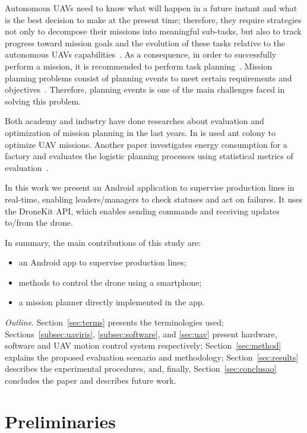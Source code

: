 \documentclass[12pt]{article}
\begin{document}
Autonomous UAVs need to know what will happen in a future instant and what is the best decision to make at the present time; therefore, they require strategies not only to decompose their missions into meaningful sub-tasks, but also to track progress toward mission goals and the evolution of these tasks relative to the autonomous UAVs capabilities~\cite{finn2012developments}. As a consequence, in order to successfully perform a mission, it is recommended to perform task planning~\cite{finn2012developments}. Mission planning problems consist of planning events to meet certain requirements and objectives~\cite{krozel1988search}. Therefore, planning events is one of the main challenges faced in solving this problem.

Both academy and industry have done researches about evaluation and optimization of mission planning in the last years. In \cite{schwarz2012towards} is used ant colony to optimize UAV missions. Another paper investigates energy consumption for a factory and evaluates the logistic planning processes using statistical metrics of evaluation~\cite{muller2012analyzing}.

In this work we present an Android application to supervise production lines in real-time, enabling leaders/managers to check statuses and act on failures. It uses the DroneKit API, which enables sending commands and receiving updates to/from the drone.

In summary, the main contributions of this study are:
\begin{itemize}
\item an Android app to supervise production lines;
\item methods to control the drone using a smartphone;
\item a mission planner directly implemented in the app.
\end{itemize}
	
\textit{Outline}. Section~\ref{sec:terms} presents the terminologies used; Sections~\ref{subsec:uaviris}, \ref{subsec:software}, and \ref{sec:uav} present hardware, software and UAV motion control system respectively; Section~\ref{sec:method} explains the proposed evaluation scenario and methodology; Section~\ref{sec:results} describes the experimental procedures, and, finally, Section~\ref{sec:conclusao} concludes the paper and describes future work.

\section{Preliminaries}
\label{sec:background}
\end{document}
